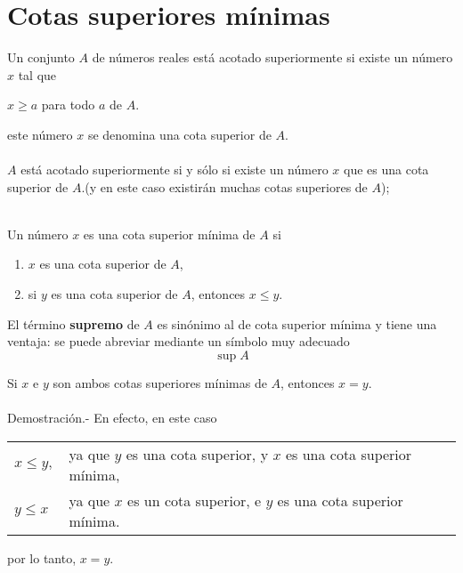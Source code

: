 \chapter{Cotas superiores mínimas}

\begin{tcolorbox}
    \begin{def.}
	Un conjunto $A$ de números reales está acotado superiormente si existe un número $x$ tal que 
	\begin{center}
	    $x\geq a$ para todo $a$ de $A$.
	\end{center}
	este número $x$ se denomina una cota superior de $A$.\\\\
    $A$ está acotado superiormente si y sólo si existe un número $x$ que es una cota superior de $A$.(y en este caso existirán muchas cotas superiores de $A$);\\\\
    \end{def.}
\end{tcolorbox}

\begin{tcolorbox}
    \begin{def.}
	Un número $x$ es una cota superior mínima de $A$ si
	\begin{enumerate}[\bfseries (1)]
	    \item $x$ es una cota superior de $A$,
	    \item si $y$ es una cota superior de $A$, entonces $x\leq y$.
	\end{enumerate}
	El término \textbf{supremo} de $A$ es sinónimo al de cota superior mínima y tiene una ventaja: se puede abreviar mediante un símbolo muy adecuado
	$$\sup A$$
    \end{def.}
\end{tcolorbox}
\vspace{0.2cm}

    Si $x$ e $y$ son ambos cotas superiores mínimas de $A$, entonces $x=y$.\\\\
	Demostración.-\; En efecto, en este caso
	\begin{center}
	\begin{tabular}{ll}
	    $x\leq y,$ & ya que $y$ es una cota superior, y $x$ es una cota superior mínima,\\
	    $y\leq x$ & ya que $x$ es un cota superior, e $y$ es una cota superior mínima.
	\end{tabular}
	\end{center}
	por lo tanto, $x=y$. \\\\

